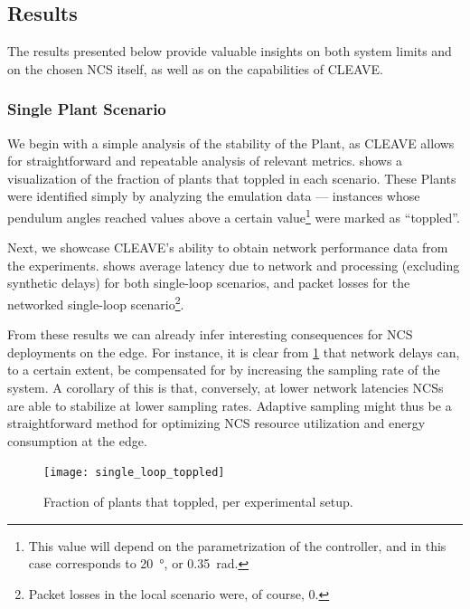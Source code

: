 \subsection{Results}\label{ssec:results}

The results presented below provide valuable insights on both system limits and on the chosen \ac{NCS} itself, as well as on the capabilities of \ac{CLEAVE}.

\subsubsection{Single Plant Scenario}

We begin with a simple analysis of the stability of the Plant, as \ac{CLEAVE} allows for straightforward and repeatable analysis of relevant metrics.  
 shows a visualization of the fraction of plants that toppled in each scenario.
These Plants were identified simply by analyzing the emulation data --- instances whose pendulum angles reached values above a certain value\footnote{This value will depend on the parametrization of the controller, and in this case corresponds to \SI{20}{\degree}, or \SI{0.35}{\radian}.} were marked as ``toppled''.

Next, we showcase \ac{CLEAVE}'s ability to obtain network performance data from the experiments.
 shows average latency due to network and processing (excluding synthetic delays) for both single-loop scenarios, and packet losses for the networked single-loop scenario\footnote{Packet losses in the local scenario were, of course, \num{0}.}.

From these results we can already infer interesting consequences for \ac{NCS} deployments on the edge.
For instance, it is clear from \cref{fig:topple:fraction} that network delays can, to a certain extent, be compensated for by increasing the sampling rate of the system.
A corollary of this is that, conversely, at lower network latencies \acp{NCS} are able to stabilize at lower sampling rates.
Adaptive sampling might thus be a straightforward method for optimizing \ac{NCS} resource utilization and energy consumption at the edge.

\begin{figure}
    \centering
    \texttt{[image: single\_loop\_toppled]}
    \caption{Fraction of plants that toppled, per experimental setup.}%
    \label{fig:topple:fraction}
\end{figure}

